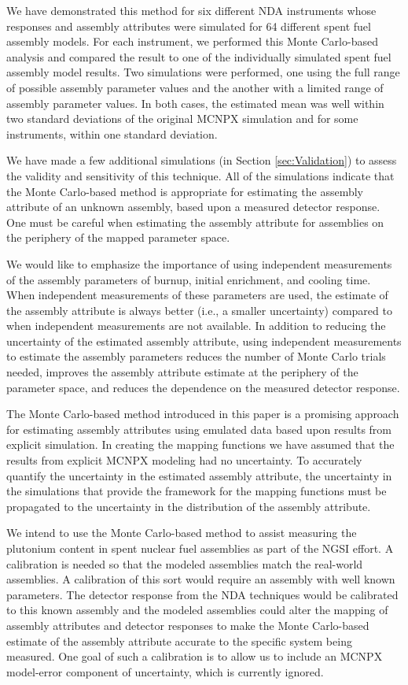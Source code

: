 \documentclass{ansnse}
\begin{document}
We have demonstrated this method for six different NDA instruments whose responses and assembly attributes were simulated for 64 different spent fuel assembly models.  For each instrument, we performed this Monte Carlo-based analysis and compared the result to one of the individually simulated spent fuel assembly model results.  Two simulations were performed, one using the full range of possible assembly parameter values and the another with a limited range of assembly parameter values.  In both cases, the estimated mean was well within two standard deviations of the original MCNPX simulation and for some instruments, within one standard deviation.

We have made a few additional simulations (in Section \ref{sec:Validation}) to assess the validity and sensitivity of this technique.  All of the simulations indicate that the Monte Carlo-based method is appropriate for estimating the assembly attribute of an unknown assembly, based upon a measured detector response.  One must be careful when estimating the assembly attribute for assemblies on the periphery of the mapped parameter space.

We would like to emphasize the importance of using independent measurements of the assembly parameters of burnup, initial enrichment, and cooling time.  When independent measurements of these parameters are used, the estimate of the assembly attribute is always better (i.e., a smaller uncertainty) compared to when independent measurements are not available.  In addition to reducing the uncertainty of the estimated assembly attribute, using independent measurements to estimate the assembly parameters reduces the number of Monte Carlo trials needed, improves the assembly attribute estimate at the periphery of the parameter space, and reduces the dependence on the measured detector response.

The Monte Carlo-based method introduced in this paper is a promising approach for estimating assembly attributes using emulated data based upon results from explicit simulation.  In creating the mapping functions we have assumed that the results from explicit MCNPX modeling had no uncertainty.  To accurately quantify the uncertainty in the estimated assembly attribute, the uncertainty in the simulations that provide the framework for the mapping functions must be propagated to the uncertainty in the distribution of the assembly attribute.  

We intend to use the Monte Carlo-based method to assist measuring the plutonium content in spent nuclear fuel assemblies as part of the NGSI effort.  A calibration is needed so that the modeled assemblies match the real-world assemblies.  A calibration of this sort would require an assembly with well known parameters.  The detector response from the NDA techniques would be calibrated to this known assembly and the modeled assemblies could alter the mapping of assembly attributes and detector responses to make the Monte Carlo-based estimate of the assembly attribute accurate to the specific system being measured.  One goal of such a calibration is to allow us to include an MCNPX model-error component of uncertainty, which is currently ignored.
\end{document}
